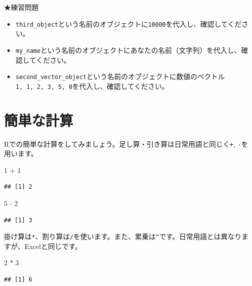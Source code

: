 \documentclass[
]{book}
\newenvironment{Shaded}{\begin{snugshade}}{\end{snugshade}}
\newcommand{\DecValTok}[1]{\textcolor[rgb]{0.00,0.00,0.81}{#1}}
\newcommand{\SpecialCharTok}[1]{\textcolor[rgb]{0.00,0.00,0.00}{#1}}
\providecommand{\tightlist}{%
  \setlength{\itemsep}{0pt}\setlength{\parskip}{0pt}}
\begin{document}
★練習問題

\begin{itemize}
\tightlist
\item
  \texttt{third\_object}という名前のオブジェクトに\texttt{10000}を代入し、確認してください。
\item
  \texttt{my\_name}という名前のオブジェクトにあなたの名前（文字列）を代入し、確認してください。
\item
  \texttt{second\_vector\_object}という名前のオブジェクトに数値のベクトル\texttt{1,\ 1,\ 2,\ 3,\ 5,\ 8}を代入し、確認してください。
\end{itemize}

\hypertarget{ux7c21ux5358ux306aux8a08ux7b97}{%
\section{簡単な計算}\label{ux7c21ux5358ux306aux8a08ux7b97}}

Rでの簡単な計算をしてみましょう。足し算・引き算は日常用語と同じく\texttt{+}, \texttt{-}を用います。

\begin{Shaded}
\begin{Highlighting}[]
\DecValTok{1} \SpecialCharTok{+} \DecValTok{1}
\end{Highlighting}
\end{Shaded}

\begin{verbatim}
## [1] 2
\end{verbatim}

\begin{Shaded}
\begin{Highlighting}[]
\DecValTok{5} \SpecialCharTok{{-}} \DecValTok{2}
\end{Highlighting}
\end{Shaded}

\begin{verbatim}
## [1] 3
\end{verbatim}

掛け算は\texttt{*}、割り算は\texttt{/}を使います。また、累乗は\texttt{\^{}}です。日常用語とは異なりますが、Excelと同じです。

\begin{Shaded}
\begin{Highlighting}[]
\DecValTok{2} \SpecialCharTok{*} \DecValTok{3}
\end{Highlighting}
\end{Shaded}

\begin{verbatim}
## [1] 6
\end{verbatim}
\end{document}
